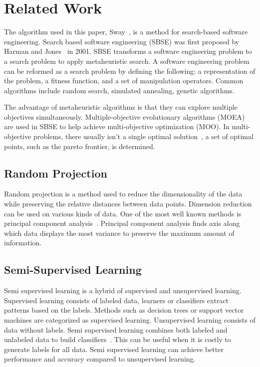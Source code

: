 \section{Related Work}
\label{sec:relwork}
The algorithm used in this paper, Sway~\cite{chen2018sampling}, is a
method for search-based software engineering.
Search based software engineering (SBSE) was first proposed by Harman and
Jones~\cite{harman2001search} in 2001. SBSE transforms a software
engineering problem to a search problem to apply metaheuristic search.
A software engineering problem can be reformed as a search problem by
defining the following: a representation of the problem, a fitness
function, and a set of manipulation operators. Common algorithms include
random search, simulated annealing, genetic algorithms.

The advantage of metaheuristic algorithms is that they can explore
multiple objectives simultaneously. Multiple-objective evolutionary
algorithms (MOEA) are used in SBSE to help achieve multi-objective
optimization (MOO). In multi-objective problems, there usually isn't a
single optimal solution~\cite{marler2004MOOsurvey}, a set of optimal
points, such as the pareto frontier, is determined. 


\subsection{Random Projection}

Random projection is a method used to reduce the dimensionality of the
data while preserving the relative distances between data points.
Dimension reduction can be used on various kinds of data.
One of the most well known methods is principal component
analysis~\cite{bingham2001random}. Principal component analysis finds
axis along which data displays the most variance to preserve the maximum
amount of information. 

\subsection{Semi-Supervised Learning}
Semi supervised learning is a hybrid of supervised and unsupervised
learning. Supervised learning consists of labeled data, learners or
classifiers extract patterns based on the labels. Methods such as
decision trees or support vector machines are categorized as supervised
learning. Unsupervised learning consists of data without labels. Semi
supervised learning combines both labeled and unlabeled data to build
classifiers~\cite{zhu2005semi}. This can be useful when it is costly to
generate labels for all data. Semi supervised learning can achieve better
performance and accuracy compared to unsupervised learning.

